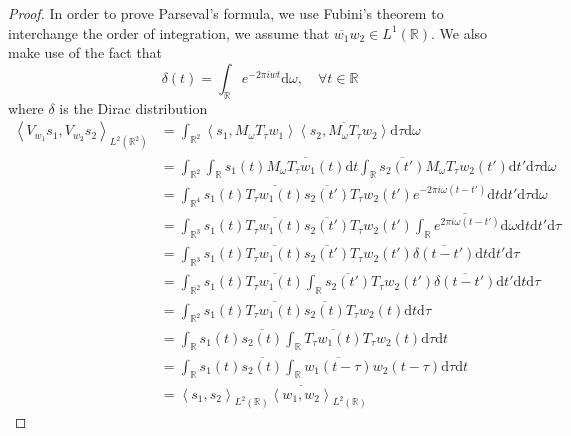 \documentclass[american,]{article}
\theoremstyle{definition}
\theoremstyle{definition}
\theoremstyle{definition}
\theoremstyle{remark}
\begin{document}
\begin{proof}
In order to prove Parseval's formula, we use Fubini's theorem
to interchange the order of integration, we assume that $\overline{w_1}w_2\in L^1(\mathbb{R})$.
We also make use of the fact that
\begin{equation}
\delta(t)=\int_\mathbb{R}e^{-2\pi iwt}\mathrm{d}\omega,\quad\forall t\in\mathbb{R}
\end{equation}
where $\delta$ is the Dirac distribution
\begin{align}
\left\langle V_{w_1}s_1,V_{w_2}s_2\right\rangle_{L^2(\mathbb{R}^2)}
&= \int_{\mathbb{R}^2} \left\langle s_1,M_\omega T_\tau w_1\right\rangle \overline{\left\langle s_2,M_\omega T_\tau w_2\right\rangle} \mathrm{d}\tau\mathrm{d}\omega\\
&= \int_{\mathbb{R}^2} \int_\mathbb{R}s_1(t)\overline{M_\omega T_\tau w_1(t)}\mathrm{d}t
               \int_\mathbb{R}\overline{s_2(t')} M_\omega T_\tau w_2(t') \mathrm{d}t' \mathrm{d}\tau\mathrm{d}\omega\\
&= \int_{\mathbb{R}^4} s_1(t)\overline{T_\tau w_1(t)}
    \overline{s_2(t')} T_\tau w_2(t') e^{-2\pi i\omega(t-t')} \mathrm{d}t\mathrm{d}t'\mathrm{d}\tau\mathrm{d}\omega\\
&= \int_{\mathbb{R}^3} s_1(t)\overline{T_\tau w_1(t)} \overline{s_2(t')} T_\tau w_2(t')
    \overline{\int_\mathbb{R}e^{2\pi i\omega(t-t')}\mathrm{d}\omega} \mathrm{d}t\mathrm{d}t'\mathrm{d}\tau\\
&= \int_{\mathbb{R}^3} s_1(t)\overline{T_\tau w_1(t)} \overline{s_2(t')} T_\tau w_2(t')
    \overline{\delta(t-t')} \mathrm{d}t\mathrm{d}t'\mathrm{d}\tau\\
&= \int_{\mathbb{R}^2} s_1(t)\overline{T_\tau w_1(t)}
    \int_\mathbb{R}\overline{s_2(t')} T_\tau w_2(t') \overline{\delta(t-t')}\mathrm{d}t'\mathrm{d}t\mathrm{d}\tau\\
&= \int_{\mathbb{R}^2} s_1(t)\overline{T_\tau w_1(t)} \overline{s_2(t)} T_\tau w_2(t)\mathrm{d}t\mathrm{d}\tau\\
&= \int_\mathbb{R}s_1(t)\overline{s_2(t)} \int_\mathbb{R}\overline{T_\tau w_1(t)} T_\tau w_2(t)\mathrm{d}\tau\mathrm{d}t\\
&= \int_\mathbb{R}s_1(t)\overline{s_2(t)} \int_\mathbb{R}\overline{w_1(t-\tau)} w_2(t-\tau)\mathrm{d}\tau\mathrm{d}t\\
&= \left\langle s_1,s_2\right\rangle_{L^2(\mathbb{R})} \overline{\left\langle w_1,w_2\right\rangle}_{L^2(\mathbb{R})}
\end{align}
\end{proof}
\end{document}
